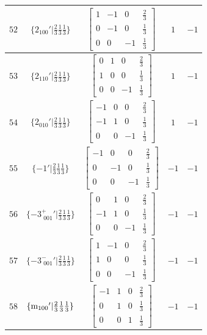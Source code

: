 \documentclass[fleqn,8pt]{jsarticle}
\begin{document}
\begin{longtable}{ccccc}
$ 52 $ & $ \{2{}_{100}{}'|\frac{2}{3} \frac{1}{3} \frac{1}{3}\} $ & $ \begin{bmatrix} 1 & -1 & 0 & \frac{2}{3} \\ 0 & -1 & 0 & \frac{1}{3} \\ 0 & 0 & -1 & \frac{1}{3} \end{bmatrix} $ & $ 1 $ & $ -1 $ \\ \hline
$ 53 $ & $ \{2{}_{110}{}'|\frac{2}{3} \frac{1}{3} \frac{1}{3}\} $ & $ \begin{bmatrix} 0 & 1 & 0 & \frac{2}{3} \\ 1 & 0 & 0 & \frac{1}{3} \\ 0 & 0 & -1 & \frac{1}{3} \end{bmatrix} $ & $ 1 $ & $ -1 $ \\ \hline
$ 54 $ & $ \{2{}_{010}{}'|\frac{2}{3} \frac{1}{3} \frac{1}{3}\} $ & $ \begin{bmatrix} -1 & 0 & 0 & \frac{2}{3} \\ -1 & 1 & 0 & \frac{1}{3} \\ 0 & 0 & -1 & \frac{1}{3} \end{bmatrix} $ & $ 1 $ & $ -1 $ \\ \hline
$ 55 $ & $ \{-1{}'|\frac{2}{3} \frac{1}{3} \frac{1}{3}\} $ & $ \begin{bmatrix} -1 & 0 & 0 & \frac{2}{3} \\ 0 & -1 & 0 & \frac{1}{3} \\ 0 & 0 & -1 & \frac{1}{3} \end{bmatrix} $ & $ -1 $ & $ -1 $ \\ \hline
$ 56 $ & $ \{-3^{+}_{\,\,001}{}'|\frac{2}{3} \frac{1}{3} \frac{1}{3}\} $ & $ \begin{bmatrix} 0 & 1 & 0 & \frac{2}{3} \\ -1 & 1 & 0 & \frac{1}{3} \\ 0 & 0 & -1 & \frac{1}{3} \end{bmatrix} $ & $ -1 $ & $ -1 $ \\ \hline
$ 57 $ & $ \{-3^{-}_{\,\,001}{}'|\frac{2}{3} \frac{1}{3} \frac{1}{3}\} $ & $ \begin{bmatrix} 1 & -1 & 0 & \frac{2}{3} \\ 1 & 0 & 0 & \frac{1}{3} \\ 0 & 0 & -1 & \frac{1}{3} \end{bmatrix} $ & $ -1 $ & $ -1 $ \\ \hline
$ 58 $ & $ \{{\rm m}_{100}{}'|\frac{2}{3} \frac{1}{3} \frac{1}{3}\} $ & $ \begin{bmatrix} -1 & 1 & 0 & \frac{2}{3} \\ 0 & 1 & 0 & \frac{1}{3} \\ 0 & 0 & 1 & \frac{1}{3} \end{bmatrix} $ & $ -1 $ & $ -1 $ \\ \hline

\end{longtable}
\end{document}
